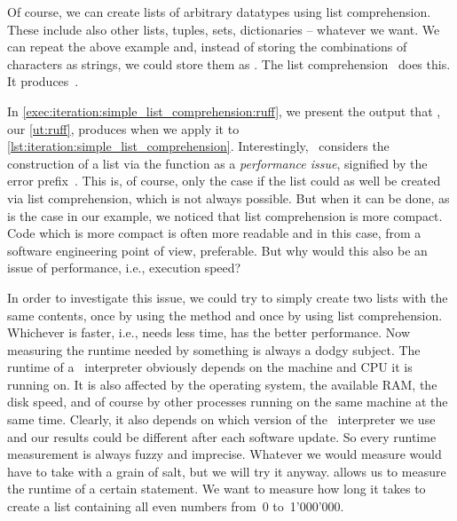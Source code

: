 %
\begin{sloppypar}%
Of course, we can create lists of arbitrary datatypes using list comprehension.
These include also other lists, tuples, sets, dictionaries -- whatever we want.
We can repeat the above example and, instead of storing the combinations of characters as strings, we could store them as .
The list comprehension~ does this.
It produces~\pythonil{[('a', 'x'), ('a', 'y'), ('b', 'x'), ('b', 'y'), ('c', 'x'), ('c', 'y')]}.
\end{sloppypar}%
%
In \cref{exec:iteration:simple_list_comprehension:ruff}, we present the output that \ruff, our \cref{ut:ruff}, produces when we apply it to \cref{lst:iteration:simple_list_comprehension}.
Interestingly, \ruff\ considers the construction of a list via the  function as a \emph{performance issue}, signified by the error prefix~.
This is, of course, only the case if the list could as well be created via list comprehension, which is not always possible.
But when it can be done, as is the case in our example, we noticed that list comprehension is more compact.
Code which is more compact is often more readable and in this case, from a software engineering point of view, preferable.
But why would this also be an issue of performance, i.e., execution speed?

%
%
%

In order to investigate this issue, we could try to simply create two lists with the same contents, once by using the  method and once by using list comprehension.
Whichever is faster, i.e., needs less time, has the better performance.
Now measuring the runtime needed by something is always a dodgy subject.
The runtime of a \python\ interpreter obviously depends on the machine and CPU it is running on.
It is also affected by the operating system, the available RAM, the disk speed, and of course by other processes running on the same machine at the same time.
Clearly, it also depends on which version of the \python\ interpreter we use and our results could be different after each software update.
So every runtime measurement is always fuzzy and imprecise.
Whatever we would measure would have to take with a grain of salt, but we will try it anyway.%
%
%
%
 allows us to measure the runtime of a certain statement.
We want to measure how long it takes to create a list containing all even numbers from~0 to~1'000'000.

